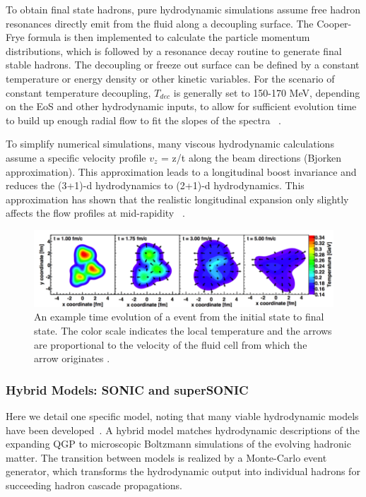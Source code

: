 To obtain final state hadrons, pure hydrodynamic simulations assume free hadron resonances directly emit from the fluid along a decoupling surface. The Cooper-Frye formula \cite{PhysRevD.10.186} is then implemented to calculate the particle momentum distributions, which is followed by a resonance decay routine to generate final stable hadrons. The decoupling or freeze out surface can be defined by a constant temperature or energy density or other kinetic variables. For the scenario of constant temperature decoupling, $T_{dec}$ is generally set to 150-170 MeV, depending on the EoS and other hydrodynamic inputs, to allow for sufficient evolution time to build up enough radial flow to fit the slopes of the \pt spectra ~\cite{Kolb:2003dz}.

To simplify numerical simulations, many viscous hydrodynamic calculations assume a specific velocity profile $v_z$ = z/t along the beam directions (Bjorken approximation). This approximation leads to a longitudinal boost invariance and reduces the (3+1)-d hydrodynamics to (2+1)-d hydrodynamics. This approximation has shown that the realistic longitudinal expansion only slightly affects the flow profiles at mid-rapidity ~\cite{Song2015}. 

\begin{figure}[h!]
\begin{center}
\includegraphics[width=0.69\linewidth]{figs/he3au_simulation.png}
\caption{An example time evolution of a \hau event from the initial state to final state. The color scale indicates the local temperature and the arrows are proportional to the velocity of the fluid cell from which the arrow originates \cite{PhysRevLett.113.112301}.}
\label{fig:heau_sim_evolve}
\end{center}
\end{figure}

\subsubsection{Hybrid Models: SONIC and superSONIC}
Here we detail one specific model, noting that many viable hydrodynamic models have been developed~\cite{Bhalerao:2014owa}.
A hybrid model matches hydrodynamic descriptions of the expanding QGP to microscopic Boltzmann simulations of the evolving hadronic matter. The transition between models is realized by a Monte-Carlo event generator, which transforms the hydrodynamic output into individual hadrons for succeeding hadron cascade propagations. 

